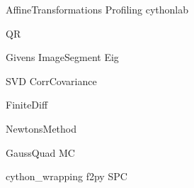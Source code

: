 \documentclass[nociteref]{SIAM-GH-book}
\begin{document}
{AffineTransformations}
{Profiling}
{cythonlab}

{QR}


{Givens}
{ImageSegment}
{Eig}


{SVD}
{CorrCovariance}

{FiniteDiff}

{NewtonsMethod}


{GaussQuad}
{MC}

{cython_wrapping}
{f2py}
{SPC}
\end{document}
